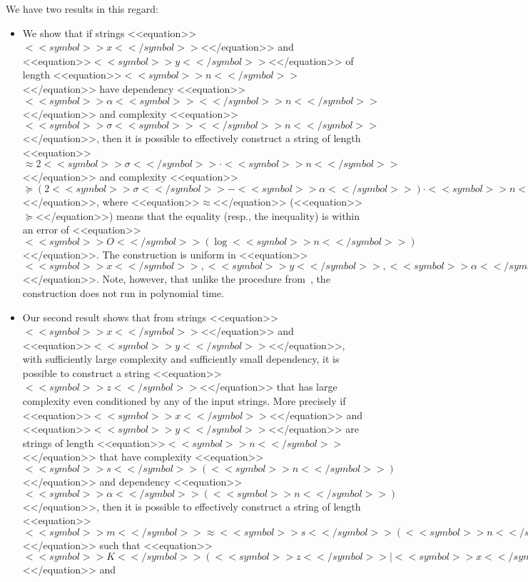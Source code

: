 \documentclass[proceedings]{stacs}
\begin{document}
We have two results in this regard:
\begin{itemize}
\item [(2)] We show that if strings <<equation>>$<<symbol>>x<</symbol>>$<</equation>> and <<equation>>$<<symbol>>y<</symbol>>$<</equation>> of length <<equation>>$<<symbol>>n<</symbol>>$<</equation>> have dependency <<equation>>$<<symbol>>\alpha <<symbol>><</symbol>>n<</symbol>>$<</equation>> and complexity <<equation>>$<<symbol>>\sigma <<symbol>><</symbol>>n<</symbol>>$<</equation>>, then it is possible to effectively construct a string of length <<equation>>$\approx 2<<symbol>>\sigma <</symbol>>\cdot <<symbol>>n<</symbol>>$<</equation>> and complexity <<equation>>$\succeq (2<<symbol>>\sigma <</symbol>>- <<symbol>>\alpha<</symbol>>) \cdot <<symbol>>n<</symbol>>$<</equation>>, where <<equation>>$\approx$<</equation>> (<<equation>>$\succeq$<</equation>>)  means that the equality (resp., the inequality) is within an error of <<equation>>$<<symbol>>O<</symbol>>(\log <<symbol>>n<</symbol>>)$<</equation>>. The construction is uniform in <<equation>>$<<symbol>>x<</symbol>>,<<symbol>>y<</symbol>>, <<symbol>>\alpha<</symbol>>, <<symbol>>\sigma<</symbol>>$<</equation>>. Note, however, that unlike the procedure from~\cite{fhpvw:c:extractKol}, the construction does not run in polynomial time.
\item[(3)] Our second result shows that from strings <<equation>>$<<symbol>>x<</symbol>>$<</equation>> and <<equation>>$<<symbol>>y<</symbol>>$<</equation>>,  with sufficiently large complexity and sufficiently small dependency, it is possible to construct a string <<equation>>$<<symbol>>z<</symbol>>$<</equation>> that has large complexity even conditioned by any of the input strings. More precisely if <<equation>>$<<symbol>>x<</symbol>>$<</equation>> and <<equation>>$<<symbol>>y<</symbol>>$<</equation>> are strings of length <<equation>>$<<symbol>>n<</symbol>>$<</equation>> that have complexity <<equation>>$<<symbol>>s<</symbol>>(<<symbol>>n<</symbol>>)$<</equation>> and dependency <<equation>>$<<symbol>>\alpha<</symbol>>(<<symbol>>n<</symbol>>)$<</equation>>, then it is possible to effectively construct a string of length <<equation>>$<<symbol>>m<</symbol>> \approx <<symbol>>s<</symbol>>(<<symbol>>n<</symbol>>)<<symbol>>/<</symbol>>2$<</equation>> such that <<equation>>$<<symbol>>K<</symbol>>(<<symbol>>z<</symbol>> \mid <<symbol>>x<</symbol>>) \succeq <<symbol>>m<</symbol>> - <<symbol>>\alpha<</symbol>>(<<symbol>>n<</symbol>>)$<</equation>> and 

\end{itemize}
\end{document}
